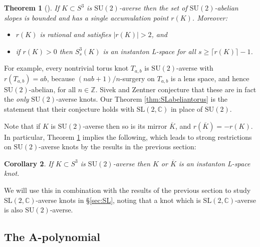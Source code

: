 \documentclass[11pt]{amsart}
\newtheorem {theorem}{Theorem}
\newtheorem {corollary}[theorem]{Corollary}
\numberwithin{equation}{section}
\numberwithin{theorem}{section}
\theoremstyle{definition}
\newcommand{\Z}{\mathbb{Z}}
\newcommand{\C}{\mathbb{C}}
\newcommand\SU{\mathrm{SU}}
\newcommand\SL{\mathrm{SL}}
\newcommand{\mirror}[1]{\overline{#1}}
\begin{document}
\begin{theorem}[] \label{thm:sz-averse}
If $K \subset S^3$ is $\SU(2)$-averse then the set of $\SU(2)$-abelian slopes is bounded and  has a single accumulation point $r(K)$. Moreover: 
\begin{itemize}
\item  $r(K)$  is rational and satisfies $|r(K)|>2$, and
\item if  $r(K) > 0$ then $S^3_s(K)$ is an instanton L-space for all $s \geq \lceil r(K) \rceil - 1$.
\end{itemize}
\end{theorem}

For example, every nontrivial torus knot $T_{a,b}$ is $\SU(2)$-averse with $r(T_{a,b}) = ab$, because $(nab+1)/n$-surgery on $T_{a,b}$ is a lens space,  and hence $\SU(2)$-abelian, for all $n\in\Z$.  Sivek and Zentner conjecture  \cite{sz-pillowcase} that these are in fact the \emph{only} $\SU(2)$-averse knots. Our Theorem \ref{thm:SLabeliantorus} is the statement that their conjecture holds with $\SL(2,\C)$ in place of $\SU(2)$.

Note that if $K$ is $\SU(2)$-averse then so is its mirror $\mirror{K}$, and  $r(\mirror{K}) = -r(K)$. In particular, Theorem \ref{thm:sz-averse} implies the following, which  leads to strong restrictions on $\SU(2)$-averse knots by the results in the previous section:

\begin{corollary}
\label{cor:SUL}
If $K \subset S^3$ is $\SU(2)$-averse then  $K$ or $\mirror{K}$ is an instanton L-space knot.
\end{corollary} 

We will use this in combination with the results of the previous section to study $\SL(2,\C)$-averse knots in \S\ref{sec:SL}, noting that a knot which is $\SL(2,\C)$-averse is also $\SU(2)$-averse.

\subsection{The A-polynomial}
\end{document}
